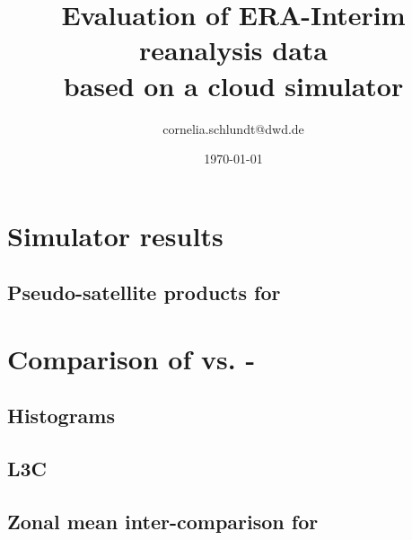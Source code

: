 \documentclass[a4paper,11pt]{article}
\begin{document}
\title{Evaluation of ERA-Interim reanalysis data\\ based on a cloud simulator}
\author{cornelia.schlundt@dwd.de}
\date{\today}
\maketitle

\tableofcontents



%
%
%
%
%


\newpage
\section{Simulator results}\label{sec:sim_results}
\subsection{Pseudo-satellite products for \MonthYear}


\newpage
\section{Comparison of {\era} vs. {\cci}-{\fv}}\label{sec:sim_vs_obs}
\subsection{Histograms}


\subsection{L3C}


\subsection{Zonal mean inter-comparison for \MonthYear}


\newpage

% 

\end{document}
